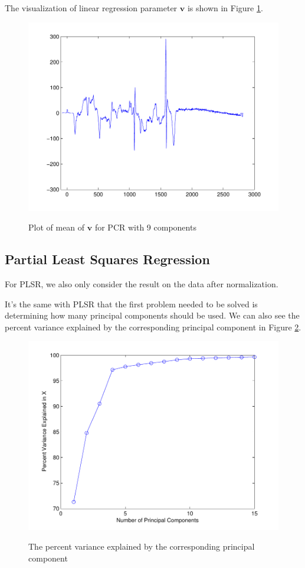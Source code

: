 \documentclass[a4paper]{article}
\newcommand{\bfv}{\mathbf{v}}
\begin{document}
The visualization of linear regression parameter $\bfv$ is shown in Figure \ref{pic5}.
\begin{figure}[h]
  \centering
  \includegraphics[width=.6\textwidth]{images/v_PCR.pdf}\\
  \caption{Plot of mean of $\bfv$ for PCR with 9 components}\label{pic5}
\end{figure}

\newpage
\subsection{Partial Least Squares Regression}
For PLSR, we also only consider the result on the data after normalization. 

It's the same with PLSR that the first problem needed to be solved is determining how many principal components should be used. We can also see the percent variance explained by the corresponding principal component in Figure \ref{plsrb1}.
\begin{figure}[h]
  \centering
  \includegraphics[width=.6\textwidth]{images/explain_PLSR.pdf}\\
  \caption{The percent variance explained by the corresponding principal component}\label{plsrb1}
\end{figure}
\end{document}
